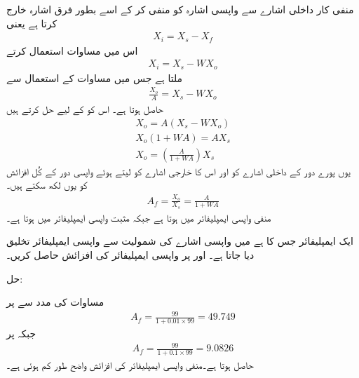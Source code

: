 منفی کار داخلی اشارے  سے واپسی اشارہ  کو منفی کر کے اسے بطور فرق اشارہ  خارج کرتا ہے یعنی
\begin{align} \label{مساوات_واپسی_فرق_اشارہ}
X_i= X_s - X_f
\end{align}
اس میں مساوات  استعمال کرتے
\begin{align} \label{مساوات_واپسی_ایمپلیفائر_کے_جماعت_بندی}
X_i= X_s - W X_o
\end{align}
ملتا ہے جس میں مساوات  کے استعمال سے
\begin{align*}
\frac{X_o}{A} =X_s - W X_o
\end{align*}
حاصل ہوتا ہے۔ اس کو  کے لیے حل کرتے ہیں
\begin{align*}
X_o =A \left( X_s-W X_o \right) \\
X_o \left (1+ W A \right ) =A X_s \\
X_o =\left(\frac{A}{1+ W A}\right) X_s
\end{align*}
یوں پورے دور کے داخلی اشارے  کو  اور اس کا خارجی اشارے کو  لیتے ہوئے واپسی دور کے کُل افزائش  کو یوں لکھ سکتے ہیں۔
\begin{align} \label{مساوات_واپسی_کل_افزائش}
A_f =\frac{X_o}{X_s}=\frac{A}{1+ W A}
\end{align}
منفی واپسی ایمپلیفائر میں   ہوتا ہے جبکہ مثبت واپسی ایمپلیفائر میں   ہوتا ہے۔

ایک ایمپلیفائر جس کا   ہے  میں واپسی اشارے کی شمولیت سے واپسی ایمپلیفائر تخلیق دیا جاتا ہے۔ اور  پر  واپسی ایمپلیفائر کی افزائش  حاصل کریں۔ 

حل:

مساوات  کی مدد سے   پر
\begin{align*}
A_f = \frac{99}{1+0.01 \times 99}=\num{49.749}
\end{align*} 
جبکہ   پر
\begin{align*}
A_f = \frac{99}{1+0.1 \times 99}=\num{9.0826}
\end{align*} 
 حاصل ہوتا ہے۔منفی واپسی ایمپلیفائر کی افزائش واضح طور کم ہوئی ہے۔ 

